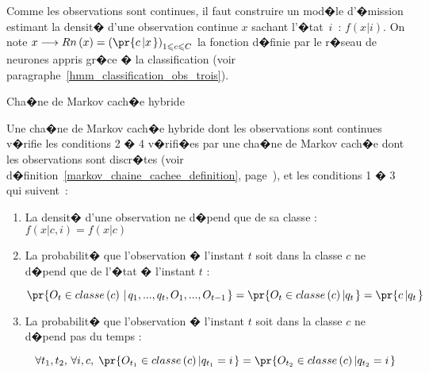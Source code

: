 Comme les observations sont continues, il faut construire un mod�le d'�mission estimant la densit� d'une observation continue $x$ sachant l'�tat~$i$~: $f\left(  x\left| i\right. \right)$. On note $x\longrightarrow Rn\left(  x\right)  =\left(  \pr{ c\left|  x\right. }  \right) _{1\leqslant c\leqslant C}$ la fonction d�finie par le r�seau de neurones appris gr�ce � la classification (voir paragraphe~\ref{hmm_classification_obs_trois}).






            \begin{xdefinition}{Cha�ne de Markov cach�e hybride}
            \label{definition_mmc_1}
            
            Une cha�ne de Markov cach�e hybride dont les observations sont continues v�rifie les conditions 2 � 4 v�rifi�es 
            par une cha�ne de Markov cach�e dont les observations sont discr�tes 
            (voir d�finition~\ref{markov_chaine_cachee_definition},
             page~\pageref{markov_chaine_cachee_definition}), et les conditions 1 � 3 qui suivent~:
            
            \begin{enumerate}
            \item La densit� d'une observation ne d�pend que de sa classe : $f\left(  x\left|  c,i\right.  \right)  =
                        f\left( x\left| c\right.  \right)$
            \item La probabilit� que l'observation � l'instant $t$ soit dans la classe $c$ ne d�pend que 
                            de l'�tat � l'instant $t$ :
            
                $$
                \pr{  O_{t}\in classe\left(  c\right)  \,\left|  \,q_{1},...,q_{t},O_{1},...,O_{t-1}\right.  } 
                             = \pr{   O_{t}\in classe\left( c\right)
                \left|  q_{t}\right.  }  = \pr{  c\left| q_{t}\right. }
                $$
                
            \item La probabilit� que l'observation � l'instant $t$ soit dans la classe $c$ ne d�pend pas du temps :
            
                $$
                \forall t_{1},t_{2},\,\forall i,c,\; \pr{   O_{t_1}\in classe\left( c\right)  \left|  q_{t_{1}}=i\right.  
                        }  = \pr{   O_{t_2}\in
                classe\left(  c\right)  \left|  q_{t_{2}}=i\right. }
                $$
            \end{enumerate}%
            \end{xdefinition}
            

